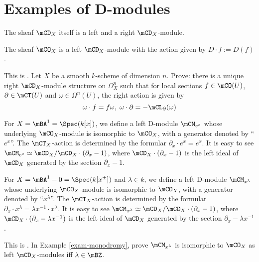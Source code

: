 \section{Examples of D-modules}

	\begin{exam}
		The sheaf $\mCD_X$ itself is a left and a right $\mCD_X$-module.
	\end{exam}

	\begin{exam}
		The sheaf $\mCO_X$ is a left $\mCD_X$-module with the action given by $D\cdot f:=D(f)$.
	\end{exam}

	\begin{exe}
		This is . Let $X$ be a smooth $k$-scheme of dimension $n$. Prove: there is a unique right $\mCD_X$-module structure on $\Omega_X^n$ such that for local sections $f\in \mCO(U)$, $\partial\in \mCT(U)$ and $\omega\in \Omega^n(U)$, the right action is given by
		\[
			\omega \cdot f = f\omega,\; \omega \cdot \partial = -\mCL_\partial(\omega)
		\]
	\end{exe}

	\begin{exam}
		For $X=\mBA^1=\Spec (k[x])$, we define a left D-module $\mCM_{e^x}$ whose underlying $\mCO_X$-module is isomorphic to $\mCO_X$, with a generator denoted by ``$e^x$''. The $\mCT_X$-action is determined by the formular $\partial_x \cdot e^x = e^x$. It is easy to see $\mCM_{e^x} \simeq \mCD_X/\mCD_X\cdot(\partial_x-1)$, where $\mCD_X\cdot(\partial_x-1)$ is the left ideal of $\mCD_X$ generated by the section $\partial_x-1$.
	\end{exam}

	\begin{exam}
		\label{exam-monodromy}
		For $X=\mBA^1-0=\Spec (k[x^\pm])$ and $\lambda\in k$, we define a left D-module $\mCM_{x^\lambda}$ whose underlying $\mCO_X$-module is isomorphic to $\mCO_X$, with a generator denoted by ``$x^\lambda$''. The $\mCT_X$-action is determined by the formular $\partial_x \cdot x^\lambda = \lambda x^{-1}\cdot x^{\lambda}$. It is easy to see $\mCM_{x^\lambda} \simeq \mCD_X/\mCD_X\cdot(\partial_x-1)$, where $\mCD_X\cdot(\partial_x-\lambda x^{-1})$ is the left ideal of $\mCD_X$ generated by the section $\partial_x-\lambda x^{-1}$.
	\end{exam}

	\begin{exe}
		This is . In Example \ref{exam-monodromy}, prove $\mCM_{x^\lambda}$ is isomorphic to $\mCO_X$ as left $\mCD_X$-modules iff $\lambda\in \mBZ$.
	\end{exe}
	

